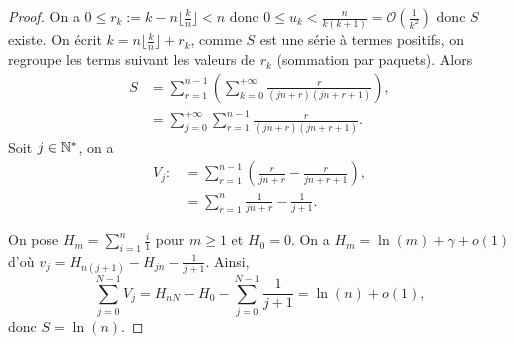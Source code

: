 \documentclass[12pt]{article}
\begin{document}
\begin{proof}
	On a $0\leqslant r_k:=k-n\lfloor\frac{k}{n}\rfloor<n$ donc $0\leqslant u_k<\frac{n}{k(k+1)}=\mathcal{O}\left(\frac{1}{k^{2}}\right)$ donc $S$ existe. On écrit $k=n\lfloor\frac{k}{n}\rfloor+r_k$, comme $S$ est une série à termes positifs, on regroupe les terms suivant les valeurs de $r_k$ (sommation par paquets). Alors 
	\begin{align*}
		S
		&=
		\sum_{r=1}^{n-1}\left(\sum_{k=0}^{+\infty}\frac{r}{(jn+r)(jn+r+1)}\right),\\
		&=
		\sum_{j=0}^{+\infty}\sum_{r=1}^{n-1}\frac{r}{(jn+r)(jn+r+1)}.
	\end{align*}
	Soit $j\in\mathbb{N}^{*}$, on a 
	\begin{align*}
		V_j
		:&=
		\sum_{r=1}^{n-1}\left(\frac{r}{jn+r}-\frac{r}{jn+r+1}\right),\\
		&=
		\sum_{r=1}^{n}\frac{1}{jn+r}-\frac{1}{j+1}.
	\end{align*}

	On pose $H_m=\sum_{i=1}^{n}\frac{i}{1}$ pour $m\geqslant 1$ et $H_0=0$. On a $H_m=\ln(m)+\gamma+o(1)$ d'où $v_j=H_{n(j+1)}-H_{jn}-\frac{1}{j+1}$. Ainsi,
	\begin{equation*}
		\sum_{j=0}^{N-1}V_j=H_{nN}-H_{0}-\sum_{j=0}^{N-1}\frac{1}{j+1}=\ln(n)+o(1),
	\end{equation*}
	donc $S=\ln(n)$.
\end{proof}
\end{document}
